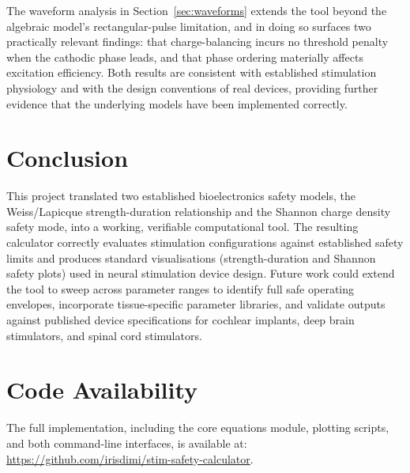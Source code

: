 \documentclass[conference]{IEEEtran}
\begin{document}
The waveform analysis in Section~\ref{sec:waveforms} extends the tool beyond the algebraic model's rectangular-pulse limitation, and in doing so surfaces two practically relevant findings: that charge-balancing incurs no threshold penalty when the cathodic phase leads, and that phase ordering materially affects excitation efficiency. Both results are consistent with established stimulation physiology and with the design conventions of real devices, providing further evidence that the underlying models have been implemented correctly.

\section{Conclusion}

This project translated two established bioelectronics safety models, the Weiss/Lapicque strength-duration relationship and the Shannon charge density safety mode, into a working, verifiable computational tool. The resulting calculator correctly evaluates stimulation configurations against established safety limits and produces standard visualisations (strength-duration and Shannon safety plots) used in neural stimulation device design. Future work could extend the tool to sweep across parameter ranges to identify full safe operating envelopes, incorporate tissue-specific parameter libraries, and validate outputs against published device specifications for cochlear implants, deep brain stimulators, and spinal cord stimulators.

\section*{Code Availability}

The full implementation, including the core equations module, plotting scripts, and both command-line interfaces, is available at: \url{https://github.com/irisdimi/stim-safety-calculator}.
\end{document}
